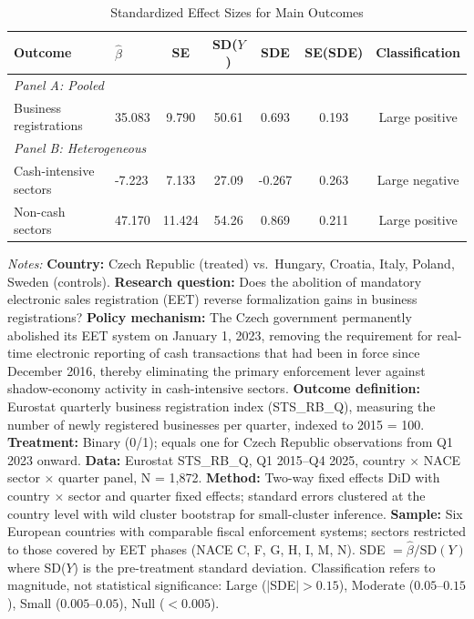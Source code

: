 
\begin{table}[H]
\centering
\caption{Standardized Effect Sizes for Main Outcomes}
\label{tab:sde}
\begin{threeparttable}
\begin{tabular}{llccccc}
\toprule
Outcome & $\hat{\beta}$ & SE & SD($Y$) & SDE & SE(SDE) & Classification \\
\midrule
\multicolumn{7}{l}{\textit{Panel A: Pooled}} \\
Business registrations & 35.083 & 9.790 & 50.61 & 0.693 & 0.193 & Large positive \\
\midrule
\multicolumn{7}{l}{\textit{Panel B: Heterogeneous}} \\
Cash-intensive sectors & -7.223 & 7.133 & 27.09 & -0.267 & 0.263 & Large negative \\
Non-cash sectors & 47.170 & 11.424 & 54.26 & 0.869 & 0.211 & Large positive \\
\bottomrule
\end{tabular}
\begin{tablenotes}[flushleft]
\small
\item \textit{Notes:} \textbf{Country:} Czech Republic (treated) vs.\ Hungary, Croatia, Italy, Poland, Sweden (controls). \textbf{Research question:} Does the abolition of mandatory electronic sales registration (EET) reverse formalization gains in business registrations? \textbf{Policy mechanism:} The Czech government permanently abolished its EET system on January 1, 2023, removing the requirement for real-time electronic reporting of cash transactions that had been in force since December 2016, thereby eliminating the primary enforcement lever against shadow-economy activity in cash-intensive sectors. \textbf{Outcome definition:} Eurostat quarterly business registration index (STS\_RB\_Q), measuring the number of newly registered businesses per quarter, indexed to 2015 = 100. \textbf{Treatment:} Binary (0/1); equals one for Czech Republic observations from Q1 2023 onward. \textbf{Data:} Eurostat STS\_RB\_Q, Q1 2015--Q4 2025, country $\times$ NACE sector $\times$ quarter panel, N = 1,872. \textbf{Method:} Two-way fixed effects DiD with country $\times$ sector and quarter fixed effects; standard errors clustered at the country level with wild cluster bootstrap for small-cluster inference. \textbf{Sample:} Six European countries with comparable fiscal enforcement systems; sectors restricted to those covered by EET phases (NACE C, F, G, H, I, M, N). SDE $= \hat{\beta} / \text{SD}(Y)$ where SD($Y$) is the pre-treatment standard deviation. Classification refers to magnitude, not statistical significance: Large ($|$SDE$| > 0.15$), Moderate ($0.05$--$0.15$), Small ($0.005$--$0.05$), Null ($< 0.005$).
\end{tablenotes}
\end{threeparttable}
\end{table}

